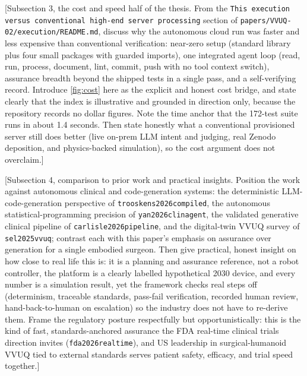 [Subsection 3, the cost and speed half of the thesis. From the \texttt{This
execution versus conventional high-end server processing} section of
\texttt{papers/VVUQ-02/execution/README.md}, discuss why the autonomous cloud run
was faster and less expensive than conventional verification: near-zero setup
(standard library plus four small packages with guarded imports), one integrated
agent loop (read, run, process, document, lint, commit, push with no tool context
switch), assurance breadth beyond the shipped tests in a single pass, and a
self-verifying record. Introduce \autoref{fig:cost} here as the explicit and honest
cost bridge, and state clearly that the index is illustrative and grounded in
direction only, because the repository records no dollar figures. Note the time
anchor that the 172-test suite runs in about 1.4 seconds. Then state honestly what
a conventional provisioned server still does better (live on-prem LLM intent and
judging, real Zenodo deposition, and physics-backed simulation), so the cost
argument does not overclaim.]

[Subsection 4, comparison to prior work and practical insights. Position the work
against autonomous clinical and code-generation systems: the deterministic
LLM-code-generation perspective of \texttt{trooskens2026compiled}, the autonomous
statistical-programming precision of \texttt{yan2026clinagent}, the validated
generative clinical pipeline of \texttt{carlisle2026pipeline}, and the digital-twin
VVUQ survey of \texttt{sel2025vvuq}; contrast each with this paper's emphasis on
assurance over generation for a single embodied surgeon. Then give practical,
honest insight on how close to real life this is: it is a planning and assurance
reference, not a robot controller, the platform is a clearly labelled hypothetical
2030 device, and every number is a simulation result, yet the framework checks
real steps off (determinism, traceable standards, pass-fail verification, recorded
human review, hand-back-to-human on escalation) so the industry does not have to
re-derive them. Frame the regulatory posture respectfully but opportunistically:
this is the kind of fast, standards-anchored assurance the FDA real-time clinical
trials direction invites (\texttt{fda2026realtime}), and US leadership in
surgical-humanoid VVUQ tied to external standards serves patient safety, efficacy,
and trial speed together.]


